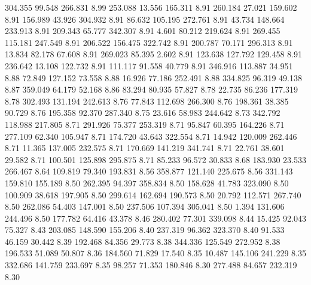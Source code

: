  304.355   99.548  266.831         8.99
 253.088   13.556  165.311         8.91
 260.184   27.021  159.602         8.91
 156.989   43.926  304.932         8.91
  86.632  105.195  272.761         8.91
  43.734  148.664  233.913         8.91
 209.343   65.777  342.307         8.91
   4.601   80.212  219.624         8.91
 269.455  115.181  247.549         8.91
 206.522  156.475  322.742         8.91
 200.787   70.171  296.313         8.91
  13.834   82.178   67.608         8.91
 269.023   85.395    2.602         8.91
 123.638  127.792  129.458         8.91
 236.642   13.108  122.732         8.91
 111.117   91.558   40.779         8.91
 346.916  113.887   34.951         8.88
  72.849  127.152   73.558         8.88
  16.926   77.186  252.491         8.88
 334.825   96.319   49.138         8.87
 359.049   64.179   52.168         8.86
  83.294   80.935   57.827         8.78
  22.735   86.236  177.319         8.78
 302.493  131.194  242.613         8.76
  77.843  112.698  266.300         8.76
 198.361   38.385   90.729         8.76
 195.358   92.370  287.340         8.75
  23.616   58.983  244.642         8.73
 342.792  118.988  217.805         8.71
 291.926   75.377  253.319         8.71
  95.847   60.395  164.226         8.71
 277.109   62.340  105.947         8.71
 174.720   43.643  322.554         8.71
  14.942  120.009  262.446         8.71
  11.365  137.005  232.575         8.71
 170.669  141.219  341.741         8.71
  22.761   38.601   29.582         8.71
 100.501  125.898  295.875         8.71
  85.233   96.572   30.833         8.68
 183.930   23.533  266.467         8.64
 109.819   79.340  193.831         8.56
 358.877  121.140  225.675         8.56
 331.143  159.810  155.189         8.50
 262.395   94.397  358.834         8.50
 158.628   41.783  323.090         8.50
 100.909   38.618  197.905         8.50
 299.614  162.694  190.573         8.50
  20.792  112.571  267.740         8.50
 262.086   54.403  147.001         8.50
 237.506  107.394  305.041         8.50
   1.394  131.606  244.496         8.50
 177.782   64.416   43.378         8.46
 280.402   77.301  339.098         8.44
  15.425   92.043   75.327         8.43
 203.085  148.590  155.206         8.40
 237.319   96.362  323.370         8.40
  91.533   46.159   30.442         8.39
 192.468   84.356   29.773         8.38
 344.336  125.549  272.952         8.38
 196.533   51.089   50.807         8.36
 184.560   71.829   17.540         8.35
  10.487  145.106  241.229         8.35
 332.686  141.759  233.697         8.35
  98.257   71.353  180.846         8.30
 277.488   84.657  232.319         8.30
